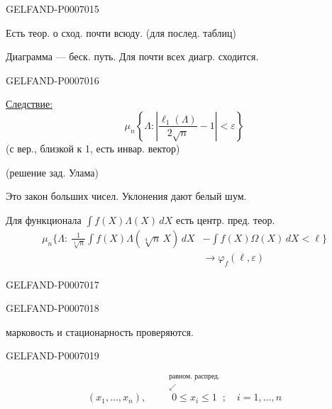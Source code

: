 \begin{GelfandAdjacentEvidence}{GELFAND-P000701}{5}

Есть теор. о сход. почти всюду. (для послед. таблиц)

Диаграмма --- беск. путь. Для почти всех диагр. сходится.
\end{GelfandAdjacentEvidence}
\begin{GelfandAdjacentEvidence}{GELFAND-P000701}{6}


\underline{Следствие:}
\[
\mu_n\left\{\Lambda:\left|\frac{\ell_1(\Lambda)}{2\sqrt n}-1\right|<\varepsilon\right\}
\]
(с вер., близкой к 1, есть инвар. вектор)

(решение зад. Улама)

Это закон больших чисел. Уклонения дают белый шум.

Для функционала \(\int f(X)\Lambda(X)\,dX\) есть центр. пред. теор.
\[
\begin{aligned}
\mu_n\biggl\{\Lambda:\ \frac{1}{\sqrt[4]{n}}\int f(X)\Lambda(\sqrt[4]{n}\,X)\,dX
  &-\int f(X)\Omega(X)\,dX<\ell\biggr\}\\[-1pt]
  &\longrightarrow\varphi_f(\ell,\varepsilon)
\end{aligned}
\]
\end{GelfandAdjacentEvidence}
\begin{GelfandAdjacentEvidence}{GELFAND-P000701}{7}

\end{GelfandAdjacentEvidence}
\begin{GelfandAdjacentEvidence}{GELFAND-P000701}{8}


марковость и стационарность проверяются.

\end{GelfandAdjacentEvidence}
\begin{GelfandAdjacentEvidence}{GELFAND-P000701}{9}

\[
(x_1,\ldots,x_n),\qquad
\overset{\substack{\underline{\text{равном. распред.}}\\\swarrow}}{0\le x_i\le1};
\quad i=1,\ldots,n
\]
\end{GelfandAdjacentEvidence}
